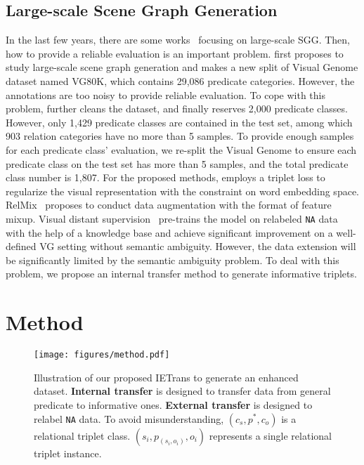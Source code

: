 \documentclass[runningheads]{llncs}
\begin{document}
\subsection{Large-scale Scene Graph Generation}
In the last few years, there are some works~\cite{abdelkarim2020long,zhuang2018hcvrd,zhang2019large,yao2021visual} focusing on large-scale SGG. 
Then, how to provide a reliable evaluation is an important problem.
\cite{zhang2019large} first proposes to study large-scale scene graph generation and makes a new split of Visual Genome dataset named VG80K, which contains 29,086 predicate categories.
However, the annotations are too noisy to provide reliable evaluation.
To cope with this problem, \cite{abdelkarim2020long} further cleans the dataset, and finally reserves 2,000 predicate classes.
However, only 1,429 predicate classes are contained in the test set, among which 903 relation categories have no more than 5 samples.
To provide enough samples for each predicate class' evaluation, we re-split the Visual Genome to ensure each predicate class on the test set has more than 5 samples, and the total predicate class number is 1,807.
For the proposed methods, \cite{zhang2019large} employs a triplet loss to regularize the visual representation with the constraint on word embedding space.
RelMix~\cite{abdelkarim2020long} proposes to conduct data augmentation with the format of feature mixup.
Visual distant supervision~\cite{yao2021visual} pre-trains the model on relabeled \texttt{NA} data with the help of a knowledge base and achieve significant improvement on a well-defined VG setting without semantic ambiguity. 
However, the data extension will be significantly limited by the semantic ambiguity problem. 
To deal with this problem, we propose an internal transfer method to generate informative triplets.


\section{Method}
\begin{figure*}[t]
    \centering
    \texttt{[image: figures/method.pdf]}
   \caption{Illustration of our proposed IETrans to generate an enhanced dataset. \textbf{Internal transfer} is designed to transfer data from general predicate to informative ones. \textbf{External transfer} is designed to relabel \texttt{NA} data. To avoid misunderstanding, $(c_s, p^*, c_o)$ is a relational triplet class.
$(s_i, p_{(s_i, o_i)}, o_i)$ represents a single relational triplet instance.}
    \label{fig:method}
\end{figure*}
\end{document}
